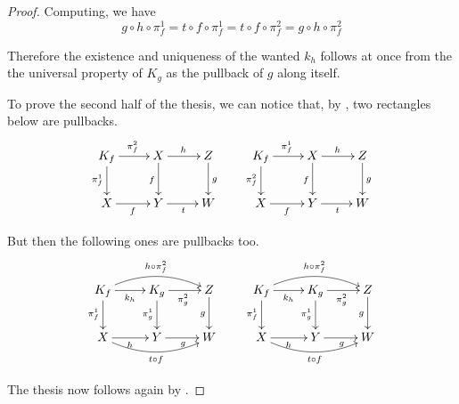 \documentclass[a4paper,UKenglish,cleveref,pdftex,thm-restate,numberwithinsect]{lipics-v2021}
\def\C{\textbf {\textup{C}}}
\newcommand{\commentato}[1]{ {} }
\newcommand{\mto}{\rightarrowtail}
\newcommand{\id}[1]{\mathsf{id}_{#1}}
\begin{document}
%
\commentato{
\subsection{Proofs for \Cref{sec:ade}}
\regmono*
\begin{proof}\label{regmono-proof}
	\begin{enumerate}
		\item  Consider the following cube in which the bottom face is an $\mathcal{M}$-pushout.
		\[\xymatrix@C=15pt@R=9pt{&A\ar[dd]|\hole_(.65){\id{A}}\ar[rr]^{g} \ar[dl]_{\id{A}} && B \ar[dd]^{\id{B}} \ar[dl]_(.6){\id{B}} \\ A  \ar@{>->}[dd]_{m}\ar[rr]^(.65){g} & & B \ar@{>->}[dd]_(.3){n}\\&A\ar[rr]|\hole^(.65){g} \ar@{>->}[dl]^{m} && B \ar@{>->}[dl]^{n} \\C \ar[rr]_{f} & & D}\]
		By construction the top face of the cube is a pushout and the back one a pullback. The left face is a pullback because $m$ is mono, thus the Van Kampen property yields that the front and the right faces are pullbacks too and the thesis follows.
		\item Let $m\colon X\mto Y$ be an arrow in $\mathcal{M}$, we can then take its pushout along itself, which, by the previous point, is also a pullback.
		\[\xymatrix{X \ar@{>->}[r]^{m} \ar@{>->}[d]_{m}& Y \ar@{>->}[d]^{h}\\ Y \ar@{>->}[r]^{k} & Z}\]
		It is now immediate to see that $m$ is the equalizer of $h$ and $k$.   \qedhere
	\end{enumerate}
\end{proof}
}

\kpp*
\begin{proof}\label{kpp-proof}
Computing, we have
\[g \circ h \circ \pi_f^1 =  t \circ f \circ \pi_f^1     =  t \circ f \circ \pi_f^2     =  g \circ h \circ \pi_f^2\]

Therefore the existence  and uniqueness of the wanted $k_h$ follows at once from the the universal property of $K_g$ as the pullback of $g$ along itself.

To prove the second half of the thesis, we can notice that, by ,  two rectangles below are pullbacks.
\[\xymatrix{K_f \ar[r]^{\pi^2_f} \ar[d]_{\pi^1_f} & X \ar[r]^{h} \ar[d]_{f} & Z \ar[d]^{g} &  K_f \ar[r]^{\pi^1_f} \ar[d]_{\pi^2_f} & X \ar[r]^{h} \ar[d]_{f} & Z \ar[d]^{g}\\
	X \ar[r]_{f}& Y \ar[r]_{t} & W & X \ar[r]_{f} & Y  \ar[r]_{t}& W}\]

But then the following ones are pullbacks too.
\[\xymatrix{	K_f  \ar@/^.4cm/[rr]^{h\circ\pi^2_f}\ar[r]_{k_h} \ar[d]_{\pi^1_f}& K_g \ar[d]_{\pi^1_g}  \ar[r]_{\pi^2_g}& Z \ar[d]_{g} & K_f  \ar@/^.4cm/[rr]^{h\circ\pi^2_f}\ar[r]_{k_h} \ar[d]_{\pi^1_f}& K_g \ar[d]_{\pi^1_g}  \ar[r]_{\pi^2_g}& Z \ar[d]_{g} \\
	X \ar[r]_{h} \ar@/_.4cm/[rr]_{t\circ f}& Y \ar[r]_{g} & W & X \ar[r]_{h} \ar@/_.4cm/[rr]_{t\circ f}& Y \ar[r]_{g} & W}\]

The thesis now follows again by .   
\end{proof}
\end{document}
